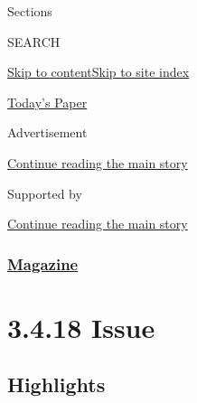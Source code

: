 Sections

SEARCH

\protect\hyperlink{site-content}{Skip to
content}\protect\hyperlink{site-index}{Skip to site index}

\href{https://myaccount.nytimes3xbfgragh.onion/auth/login?response_type=cookie\&client_id=vi}{}

\href{https://www.nytimes3xbfgragh.onion/section/todayspaper}{Today's
Paper}

Advertisement

\protect\hyperlink{after-top}{Continue reading the main story}

Supported by

\protect\hyperlink{after-sponsor}{Continue reading the main story}

\hypertarget{magazine}{%
\subsubsection{\texorpdfstring{\href{/section/magazine}{Magazine}}{Magazine}}\label{magazine}}

\hypertarget{3418-issue}{%
\section{3.4.18 Issue}\label{3418-issue}}

\hypertarget{highlights}{%
\subsection{Highlights}\label{highlights}}

